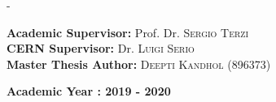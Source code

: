 \begin{titlingpage}
\begin{SingleSpace}
\begin{adjustwidth*}{\unitlength}{-\unitlength}
\vspace{2mm}
\begin{flushleft}
{\LARGE \textbf{Academic Supervisor:} Prof. Dr. \textsc{Sergio Terzi}}\\ 
\vspace{2mm}
{\LARGE \textbf{CERN Supervisor:} Dr. \textsc{Luigi Serio}}\\ 
\vspace{2mm}
{\LARGE  \textbf{Master Thesis Author:} \textsc{Deepti Kandhol (896373)}}\\ 
\end{flushleft}
\vspace{6mm}
\begin{center}
	\vspace{6mm}
	\large \textbf{Academic Year : 2019 - 2020}
	\vspace{2mm}
\end{center}



\end{adjustwidth*}
\end{SingleSpace}
\end{titlingpage}